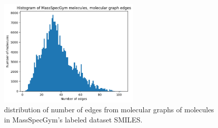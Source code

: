 \begin{figure}[H]
    \centering
    \includegraphics[width=0.6\textwidth]{figures/discussion/number_of_edges_massspecgym.png}
    \caption{distribution of number of edges from molecular graphs of molecules in MassSpecGym's labeled dataset SMILES.}
    \label{fig:edges}
\end{figure}